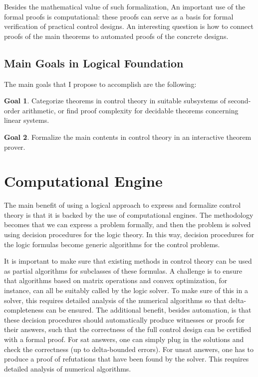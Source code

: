 \documentclass[10pt]{article}
\theoremstyle{definition}
\newtheorem{goal}{Goal}
\begin{document}
Besides the mathematical value of such formalization, An important use of the formal proofs is computational: these proofs can serve as a basis for formal verification of practical control designs. An interesting question is how to connect proofs of the main theorems to automated proofs of the concrete designs. 

\subsection{Main Goals in Logical Foundation}

The main goals that I propose to accomplish are the following:
\begin{goal}
Categorize theorems in control theory in suitable subsystems of second-order arithmetic, or find proof complexity for decidable theorems concerning linear systems. 
\end{goal}
\begin{goal}
Formalize the main contents in control theory in an interactive theorem prover.  
\end{goal}

\section{Computational Engine}\label{ce}

The main benefit of using a logical approach to express and formalize control theory is that it is backed by the use of computational engines. The methodology becomes that we can express a problem formally, and then the problem is solved using decision procedures for the logic theory. In this way, decision procedures for the logic formulas become generic algorithms for the control problems. 

It is important to make sure that existing methods in control theory can be used as partial algorithms for subclasses of these formulas. A challenge is to ensure that algorithms based on matrix operations and convex optimization, for instance, can all be suitably called by the logic solver. To make sure of this in a solver, this requires detailed analysis of the numerical algorithms so that delta-completeness can be ensured. The additional benefit, besides automation, is that these decision procedures should automatically produce witnesses or proofs for their answers, such that the correctness of the full control design can be certified with a formal proof. For sat answers, one can simply plug in the solutions and check the correctness (up to delta-bounded errors). For unsat answers, one has to produce a proof of refutations that have been found by the solver. This requires detailed analysis of numerical algorithms.
\end{document}
